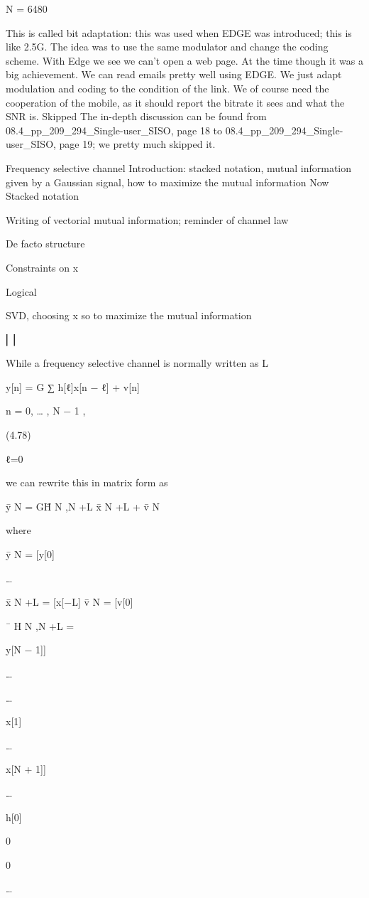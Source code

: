 {{{{{N = 6480

This is called bit adaptation: this was used when EDGE was introduced; this is like 2.5G.
The idea was to use the same modulator and change the coding scheme. With Edge we see we can't open a web page. At the time though it was a big achievement. We can read emails pretty well using EDGE.
We just adapt modulation and coding to the condition of the link. We of course need the cooperation of the mobile, as it should report the bitrate it sees and what the SNR is.
Skipped The in-depth discussion can be found from 08.4_pp_209_294_Single-user_SISO, page 18 to 08.4_pp_209_294_Single-user_SISO, page 19; we pretty much skipped it.

Frequency selective channel Introduction: stacked notation, mutual information given by a Gaussian signal, how to maximize the mutual information Now Stacked notation

Writing of vectorial mutual information;
reminder of channel law

De facto structure

Constraints on x

Logical

SVD, choosing x so to maximize the mutual information

⎢⎥

While a frequency selective channel is normally written as L

y[n] = \sqrt G ∑ h[ℓ]x[n − ℓ] + v[n]

n = 0, … , N − 1 ,

(4.78)

ℓ=0

we can rewrite this in matrix form as

ȳ N = \sqrt GH̄ N ,N +L x̄ N +L + v̄ N

where

ȳ N = [y[0]

…

x̄ N +L = [x[−L]
v̄ N = [v[0]

¯
H N ,N +L =

y[N − 1]]

…

…

x[1]

…

x[N + 1]]

…

h[0]

0

0

…

}}}}}
